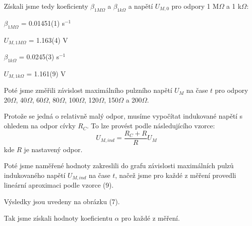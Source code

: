 \documentclass[a4paper,11pt]{article}
\begin{document}
    \begin{minipage}[t]{0.5\textwidth} 
                Získali jsme tedy koeficienty $\beta_{1 M\Omega}$ a $\beta_{1 k\Omega}$ a napětí $U_{M,0}$ pro odpory 1 M$\Omega$ a 1 k$\Omega$:
                \begin{center}
                    \begin{multicols}{2}
                        $\beta_{1 M\Omega}$ = 0.01451(1) s$^{-1}$
                        \vspace{5pt}
                        \par $U_{M,1 M\Omega}$ = 1.163(4) V
                        \vspace{10pt}
                        \par $\beta_{1 k\Omega}$ = 0.0245(3) s$^{-1}$
                        \vspace{5pt}
                        \par $U_{M,1 k\Omega}$ = 1.161(9) V
                    \end{multicols}
                \end{center}
                Poté jsme změřili závislost maximálního pulzního napětí $U_M$ na čase $t$ pro odpory 20$\Omega$, 40$\Omega$, 60$\Omega$, 80$\Omega$, 100$\Omega$, 120$\Omega$, 150$\Omega$ a 200$\Omega$.
                \par Protože se jedná o relativně malý odpor, musíme vypočítat indukované napětí s ohledem na odpor cívky $R_C$. To lze provést podle následujícího vzorce:
                \begin{equation}
                    U_{M,ind} = \frac{R_C + R}{R} U_{M}
                \end{equation}
                kde $R$ je nastavený odpor.
                \par Poté jsme naměřené hodnoty zakreslili do grafu závislosti maximálních pulzů indukovaného napětí $U_{M,ind}$ na čase $t$, načež jsme pro každé z měření provedli lineární aproximaci podle vzorce (9). 
                \par Výsledky jsou uvedeny na obrázku (7).
                \par Tak jsme získali hodnoty koeficientu $\alpha$ pro každé z měření.
    \end{minipage}
    \hspace{10pt}
\end{document}
